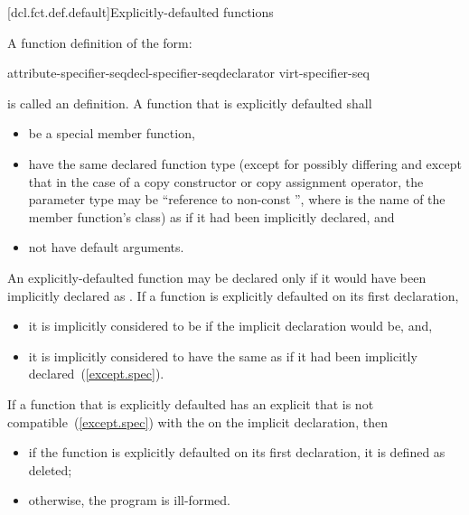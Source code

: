 [dcl.fct.def.default]{Explicitly-defaulted functions}%

\pnum
A function definition of the form:

\begin{ncbnf}
    attribute-specifier-seq\opt decl-specifier-seq\opt declarator virt-specifier-seq\opt {}
\end{ncbnf}

is called an  definition.
A function that is explicitly defaulted shall

\begin{itemize}
\item be a special member function,

\item have the same declared function type (except for possibly differing
 and except that in the case of a copy constructor or
copy assignment operator, the parameter type may be ``reference to non-const '',
where  is the name of the member function's class) as if it had been implicitly
declared, and

\item not have default arguments.
\end{itemize}

\pnum
An explicitly-defaulted function may be declared
 only if it would have been implicitly declared as
. If
a function is explicitly defaulted on its first declaration,

\begin{itemize}
\item it is implicitly considered to be  if the implicit
declaration would be, and,
\item it is implicitly considered to have the same 
as if it had been implicitly declared~(\ref{except.spec}).
\end{itemize}

\pnum
If a function that is explicitly defaulted has an explicit
 that is not compatible~(\ref{except.spec})
with the  on the implicit declaration, then

\begin{itemize}
\item if the function is explicitly defaulted on its first declaration, it is defined as deleted;
\item otherwise, the program is ill-formed.
\end{itemize}

